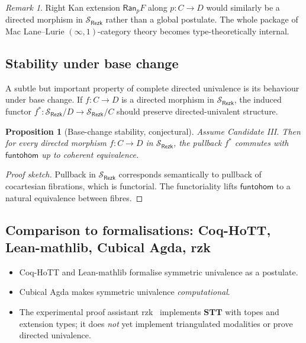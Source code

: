 \documentclass[12pt]{article}
\newtheorem{proposition}[theorem]{Proposition}
\theoremstyle{definition}
\theoremstyle{remark}
\newtheorem{remark}[theorem]{Remark}
\newcommand{\funtohom}{\mathsf{funtohom}}
\newcommand{\STT}{\mathbf{STT}}
\begin{document}
\begin{remark}\label{rem:kan-ext}
Right Kan extension $\mathsf{Ran}_p F$ along $p : C \to D$ would similarly be a directed morphism in $\mathcal{S}_{\mathsf{Rezk}}$ rather than a global postulate. The whole package of Mac Lane--Lurie $(\infty,1)$-category theory becomes type-theoretically internal.
\end{remark}

\subsection{Stability under base change}

A subtle but important property of complete directed univalence is its behaviour under base change. If $f : C \to D$ is a directed morphism in $\mathcal{S}_{\mathsf{Rezk}}$, the induced functor $f^* : \mathcal{S}_{\mathsf{Rezk}}/D \to \mathcal{S}_{\mathsf{Rezk}}/C$ should preserve directed-univalent structure.

\begin{proposition}[Base-change stability, conjectural]\label{prop:base-change}
Assume Candidate III\@. Then for every directed morphism $f : C \to D$ in $\mathcal{S}_{\mathsf{Rezk}}$, the pullback $f^*$ commutes with $\funtohom$ up to coherent equivalence.
\end{proposition}

\begin{proof}[Proof sketch]
Pullback in $\mathcal{S}_{\mathsf{Rezk}}$ corresponds semantically to pullback of cocartesian fibrations, which is functorial. The functoriality lifts $\funtohom$ to a natural equivalence between fibres.
\end{proof}

\subsection{Comparison to formalisations: Coq-HoTT, Lean-mathlib, Cubical Agda, rzk}

\begin{itemize}
\item Coq-HoTT and Lean-mathlib formalise symmetric univalence as a postulate.
\item Cubical Agda makes symmetric univalence \emph{computational}.
\item The experimental proof assistant rzk~\cite{rzk} implements $\STT$ with topes and extension types; it does \emph{not} yet implement triangulated modalities or prove directed univalence.
\end{itemize}
\end{document}
